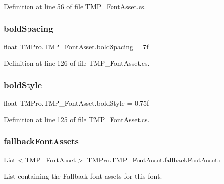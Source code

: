 Definition at line 56 of file T\+M\+P\+\_\+\+Font\+Asset.\+cs.

\mbox{\label{class_t_m_pro_1_1_t_m_p___font_asset_a0a4fbd91f8b10c17a222c4b56a586c50}} 
\subsubsection{\texorpdfstring{boldSpacing}{boldSpacing}}
{\footnotesize\ttfamily float T\+M\+Pro.\+T\+M\+P\+\_\+\+Font\+Asset.\+bold\+Spacing = 7f}



Definition at line 126 of file T\+M\+P\+\_\+\+Font\+Asset.\+cs.

\mbox{\label{class_t_m_pro_1_1_t_m_p___font_asset_a16dbe5f4d6f79766b9cd9745c94bbc9c}} 
\subsubsection{\texorpdfstring{boldStyle}{boldStyle}}
{\footnotesize\ttfamily float T\+M\+Pro.\+T\+M\+P\+\_\+\+Font\+Asset.\+bold\+Style = 0.\+75f}



Definition at line 125 of file T\+M\+P\+\_\+\+Font\+Asset.\+cs.

\mbox{\label{class_t_m_pro_1_1_t_m_p___font_asset_acb4defd1335d404d2e984bd130c59fe1}} 
\subsubsection{\texorpdfstring{fallbackFontAssets}{fallbackFontAssets}}
{\footnotesize\ttfamily List$<$\mbox{\hyperlink{class_t_m_pro_1_1_t_m_p___font_asset}{T\+M\+P\+\_\+\+Font\+Asset}}$>$ T\+M\+Pro.\+T\+M\+P\+\_\+\+Font\+Asset.\+fallback\+Font\+Assets}



List containing the Fallback font assets for this font. 




